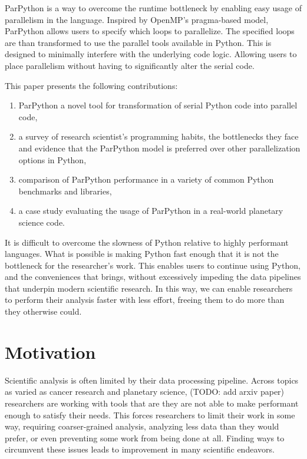 \documentclass[conference]{IEEEtran}
\begin{document}
ParPython is a way to overcome the runtime bottleneck by enabling
easy usage of parallelism in the language. 
Inspired by OpenMP's pragma-based model\cite{dagum1998openmp}, 
ParPython allows users to specify which loops to parallelize. 
The specified loops are than
transformed to use the parallel tools available in Python. 
This is designed to minimally interfere with the underlying code logic.
Allowing users to place parallelism without having to significantly alter
the serial code.

This paper presents the following contributions: 
\begin{enumerate}
    \item ParPython a novel tool for transformation of serial Python code
    into parallel code,
    \item a survey of research scientist's programming habits, the
    bottlenecks they face and evidence that the ParPython model is 
    preferred over other parallelization options in Python,
    \item comparison of ParPython performance in a variety of 
    common Python benchmarks and libraries,
    \item a case study evaluating the usage of ParPython in
    a real-world planetary science code. 
\end{enumerate}

It is difficult to overcome the slowness of Python relative to
highly performant languages.
What is possible is making Python fast enough that it is not the 
bottleneck for the researcher's work.
This enables users to continue using Python, and the conveniences that 
brings, without excessively impeding the data pipelines that underpin 
modern scientific research.
In this way, we can enable researchers to perform their analysis
faster with less effort, freeing them to do more than they otherwise 
could.

\section{Motivation}

Scientific analysis is often limited by their data processing pipeline.
Across topics as varied as cancer research \cite{danford2016analyzing} and planetary science, (TODO: add arxiv paper)
researchers are working with tools that are they are not able to make performant enough to satisfy their needs.
This forces researchers to limit their work in some way, requiring coarser-grained analysis, analyzing less data than they would prefer,
or even preventing some work from being done at all.
Finding ways to circumvent these issues leads to improvement in
many scientific endeavors.
\end{document}
